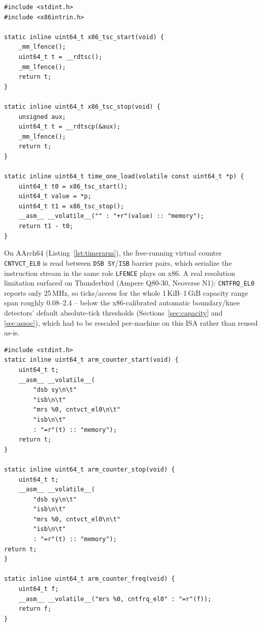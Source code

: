\documentclass{article}
\begin{document}
\begin{lstlisting}[caption={x86-64 serialized TSC timer. File: \texttt{main\_code/x86\_64/timer\_x86.h}, commit \texttt{e0f2538}. Target architecture: x86-64.},label={lst:timerx86}]
#include <stdint.h>
#include <x86intrin.h>

static inline uint64_t x86_tsc_start(void) {
    _mm_lfence();
    uint64_t t = __rdtsc();
    _mm_lfence();
    return t;
}

static inline uint64_t x86_tsc_stop(void) {
    unsigned aux;
    uint64_t t = __rdtscp(&aux);
    _mm_lfence();
    return t;
}

static inline uint64_t time_one_load(volatile const uint64_t *p) {
    uint64_t t0 = x86_tsc_start();
    uint64_t value = *p;
    uint64_t t1 = x86_tsc_stop();
    __asm__ __volatile__("" : "+r"(value) :: "memory");
    return t1 - t0;
}
\end{lstlisting}

On AArch64 (Listing~\ref{lst:timerarm}), the free-running virtual counter
\texttt{CNTVCT\_EL0} is read between \texttt{DSB SY}/\texttt{ISB} barrier pairs, which
serialize the instruction stream in the same role \texttt{LFENCE} plays on x86. A real
resolution limitation surfaced on Thunderbird (Ampere Q80-30, Neoverse N1):
\texttt{CNTFRQ\_EL0} reports only 25\,MHz, so ticks/access for the whole 1\,KiB--1\,GiB
capacity range span roughly 0.08--2.4 -- below the x86-calibrated automatic boundary/knee
detectors' default absolute-tick thresholds (Sections~\ref{sec:capacity} and
\ref{sec:assoc}), which had to be rescaled per-machine on this ISA rather than reused
as-is.

\begin{lstlisting}[caption={AArch64 serialized virtual-counter timer. File: \texttt{main\_code/aarch64/timer\_arm.h}, commit \texttt{e0f2538}. Target architecture: AArch64.},label={lst:timerarm}]
#include <stdint.h>
static inline uint64_t arm_counter_start(void) {
    uint64_t t;
    __asm__ __volatile__(
        "dsb sy\n\t"
        "isb\n\t"
        "mrs %0, cntvct_el0\n\t"
        "isb\n\t"
        : "=r"(t) :: "memory");
    return t;
}

static inline uint64_t arm_counter_stop(void) {
    uint64_t t;
    __asm__ __volatile__(
        "dsb sy\n\t"
        "isb\n\t"
        "mrs %0, cntvct_el0\n\t"
        "isb\n\t"
        : "=r"(t) :: "memory");
return t;
}

static inline uint64_t arm_counter_freq(void) {
    uint64_t f;
    __asm__ __volatile__("mrs %0, cntfrq_el0" : "=r"(f));
    return f;
}
\end{lstlisting}
\end{document}

